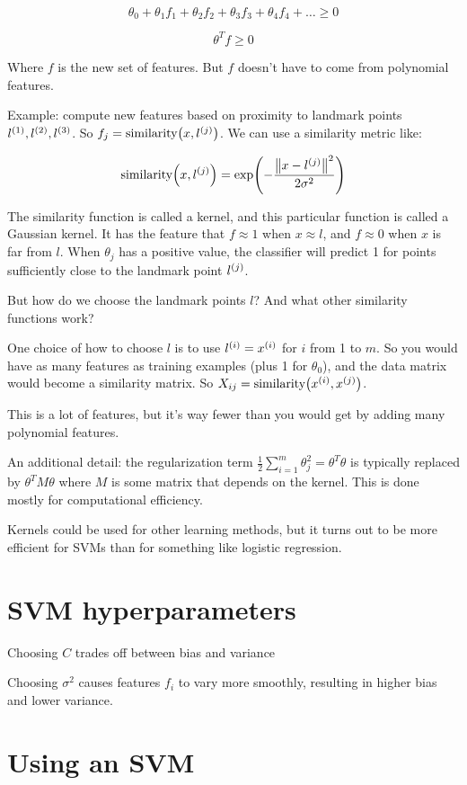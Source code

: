 \[
    \theta_0 + \theta_1 f_1 + \theta_2 f_2 + \theta_3 f_3 + \theta_4 f_4 + \dots \geq 0
\]

\[
    \theta^T f \geq 0
\]

Where $f$ is the new set of features.  But $f$ doesn't have to come from polynomial features.

Example: compute new features based on proximity to landmark points $l_{}^{(1)}, l_{}^{(2)}, l_{}^{(3)}$.
So $f_j = \text{similarity}\qty(x,l_{}^{(j)})$.
We can use a similarity metric like:

\[
    \text{similarity}\qty(x,l_{}^{(j)}) = \exp(-\frac{\left\lVert x-l_{}^{(j)} \right\rVert^2}{2\sigma^2})
\]

The similarity function is called a kernel, and this particular function is called a Gaussian kernel.
It has the feature that $f \approx 1$ when $x \approx l$, and $f \approx 0$ when $x$ is far from $l$.
When $\theta_j$ has a positive value, the classifier will predict 1 for points sufficiently close to
the landmark point $l_{}^{(j)}$.

But how do we choose the landmark points $l$?  And what other similarity functions work?

One choice of how to choose $l$ is to use $l_{}^{(i)} = x_{}^{(i)}$ for $i$ from 1 to $m$.
So you would have as many features as training examples (plus 1 for $\theta_0$),
and the data matrix would become a similarity matrix.
So $X_{ij} = \text{similarity}\qty(x_{}^{(i)}, x_{}^{(j)})$.

This is a lot of features, but it's way fewer than you would get by adding many polynomial features.

An additional detail: the regularization term $\frac{1}{2} \sum_{i=1}^m \theta_j^2 = \theta^T \theta$
is typically replaced by $\theta^T M \theta$ where $M$ is some matrix that depends on the kernel.
This is done mostly for computational efficiency.

Kernels could be used for other learning methods, but it turns out to be more efficient for SVMs
than for something like logistic regression.

\section{SVM hyperparameters}

Choosing $C$ trades off between bias and variance

Choosing $\sigma^2$ causes features $f_i$ to vary more smoothly,
resulting in higher bias and lower variance.

\section{Using an SVM}

